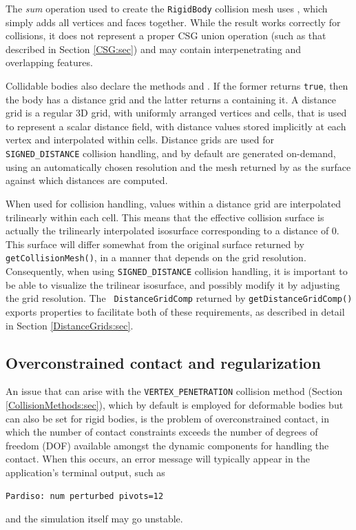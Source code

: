 \begin{sideblock}
The {\it sum} operation used to create the {\tt RigidBody} collision
mesh uses , which simply
adds all vertices and faces together. While the result works
correctly for collisions, it does not represent a proper CSG union
operation (such as that described in Section \ref{CSG:sec}) and may
contain interpenetrating and overlapping features.
\end{sideblock}

Collidable bodies also declare the methods
and
.
If the former returns {\tt true}, then the body has a distance grid
and the latter returns a 
containing it.  A distance grid is a regular 3D grid, with uniformly
arranged vertices and cells, that is used to represent a scalar
distance field, with distance values stored implicitly at each vertex
and interpolated within cells. Distance grids are used for {\tt
SIGNED\_DISTANCE} collision handling, and by default are generated
on-demand, using an automatically chosen resolution and the mesh
returned by
as the surface against which distances are computed.

When used for collision handling, values within a distance grid are
interpolated trilinearly within each cell. This means that the
effective collision surface is actually the trilinearly interpolated
isosurface corresponding to a distance of 0. This surface will differ
somewhat from the original surface returned by {\tt
getCollisionMesh()}, in a manner that depends on the grid resolution.
Consequently, when using {\tt SIGNED\_DISTANCE} collision handling, it
is important to be able to visualize the trilinear isosurface, and
possibly modify it by adjusting the grid resolution. The {\tt
DistanceGridComp} returned by {\tt getDistanceGridComp()} exports
properties to facilitate both of these requirements, as described in
detail in Section \ref{DistanceGrids:sec}.

\subsection{Overconstrained contact and regularization}
\label{OverconstrainedContact:sec}

An issue that can arise with the {\tt VERTEX\_PENETRATION} collision
method (Section \ref{CollisionMethods:sec}), which by default is
employed for deformable bodies but can also be set for rigid bodies,
is the problem of overconstrained contact, in which the number of
contact constraints exceeds the number of degrees of freedom (DOF)
available amongst the dynamic components for handling the
contact. When this occurs, an error message will typically appear in
the application's terminal output, such as
%
\begin{verbatim}
Pardiso: num perturbed pivots=12
\end{verbatim}
%
and the simulation itself may go unstable. 

